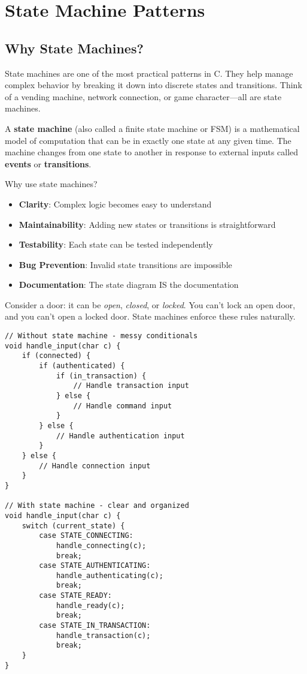 \chapter{State Machine Patterns}

\section{Why State Machines?}

State machines are one of the most practical patterns in C. They help manage complex behavior by breaking it down into discrete states and transitions. Think of a vending machine, network connection, or game character—all are state machines.

A \textbf{state machine} (also called a finite state machine or FSM) is a mathematical model of computation that can be in exactly one state at any given time. The machine changes from one state to another in response to external inputs called \textbf{events} or \textbf{transitions}.

Why use state machines?

\begin{itemize}
    \item \textbf{Clarity}: Complex logic becomes easy to understand
    \item \textbf{Maintainability}: Adding new states or transitions is straightforward
    \item \textbf{Testability}: Each state can be tested independently
    \item \textbf{Bug Prevention}: Invalid state transitions are impossible
    \item \textbf{Documentation}: The state diagram IS the documentation
\end{itemize}

Consider a door: it can be \textit{open}, \textit{closed}, or \textit{locked}. You can't lock an open door, and you can't open a locked door. State machines enforce these rules naturally.

\begin{lstlisting}
// Without state machine - messy conditionals
void handle_input(char c) {
    if (connected) {
        if (authenticated) {
            if (in_transaction) {
                // Handle transaction input
            } else {
                // Handle command input
            }
        } else {
            // Handle authentication input
        }
    } else {
        // Handle connection input
    }
}

// With state machine - clear and organized
void handle_input(char c) {
    switch (current_state) {
        case STATE_CONNECTING:
            handle_connecting(c);
            break;
        case STATE_AUTHENTICATING:
            handle_authenticating(c);
            break;
        case STATE_READY:
            handle_ready(c);
            break;
        case STATE_IN_TRANSACTION:
            handle_transaction(c);
            break;
    }
}
\end{lstlisting}

